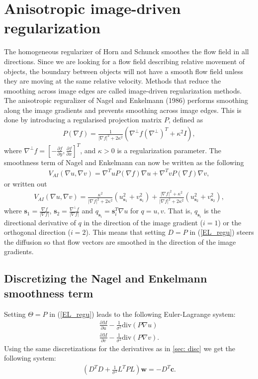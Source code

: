 \documentclass[10pt,a4paper]{article}
\begin{document}
\section{Anisotropic image-driven regularization}
The homogeneous regularizer of Horn and Schunck smoothes the flow field in all directions. Since we are looking for a flow field describing relative movement of objects, the boundary between objects will not have a smooth flow field unless they are moving at the same relative velocity. Methods that reduce the smoothing across image edges are called image-driven regularization methods. The anisotropic reguralizer of Nagel and Enkelmann (1986) performs smoothing along the image gradients and prevents smoothing across image edges. This is done by introducing a regularised projection matrix $P$, defined as
\begin{align*}
P(\nabla f) = \frac{1}{|\nabla f|^2 + 2 \kappa^2} (\nabla^{\bot} f (\nabla^{\bot})^T + \kappa^2 I),
\end{align*}
where $\nabla^{\bot} f= \left[-\frac{\partial f}{\partial y}, \frac{\partial f}{\partial x}\right]^T$, and $\kappa > 0$ is a regularization parameter. The smoothness term of Nagel and Enkelmann can now be written as the following
\begin{align*}
V_{AI}(\nabla u, \nabla v) = \nabla ^T u P(\nabla f) \nabla u + \nabla ^T v P(\nabla f) \nabla v,
\end{align*}
or written out 
\begin{align*}
V_{AI}(\nabla u, \nabla v) = \frac{\kappa^2}{|\nabla f|^2 + 2 \kappa^2} \left( u_{\textbf{s}_1}^2 + v_{\textbf{s}_1}^2 \right) + \frac{|\nabla f|^2 + \kappa^2}{|\nabla f|^2 + 2 \kappa^2} \left(u_{\textbf{s}_2}^2 + v_{\textbf{s}_2}^2 \right),
\end{align*}
where $\textbf{s}_1 = \frac{\nabla f}{|\nabla f|}$, $\textbf{s}_2 = \frac{\nabla^{\bot} f}{|\nabla f|}$ and $q_{\textbf{s}_i} = \textbf{s}_i^T \nabla u$ for $q = u, v$. That is, $q_{\textbf{s}_i}$ is the directional derivative of $q$ in the direction of the image gradient ($i=1$) or the orthogonal direction ($i=2$). This means that setting $D=P$ in (\ref{EL_regu}) steers the diffusion so that flow vectors are smoothed in the direction of the image gradients.

\subsection{Discretizing the Nagel and Enkelmann smoothness term}
Setting $\Theta=P$ in (\ref{EL_regu}) leads to the following Euler-Lagrange system:
\begin{align*}
\frac{\partial M}{\partial u} - \frac{1}{\sigma^2} \text{div}(P \nabla u) \\
\frac{\partial M}{\partial v} - \frac{1}{\sigma^2} \text{div}(P \nabla v).
\end{align*}
Using the same discretizations for the derivatives as in \ref{sec: disc} we get the following system:
\begin{align*}
(D^T D + \frac{1}{\sigma^2} L^TPL) \textbf{w} = - D^T \textbf{c}.
\end{align*}
\end{document}
